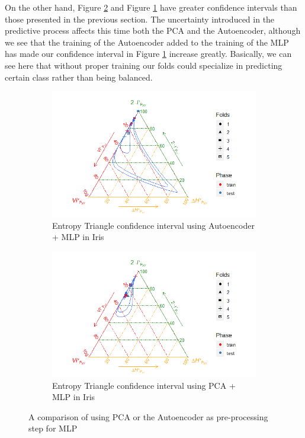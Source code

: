 On the other hand, Figure \ref{fig:figure_MLP_Iris_ET_PCA_Confidence} and Figure \ref{fig:figure_MLP_Iris_ET_Auto_Confidence} have greater confidence intervals than those presented in the previous section. The uncertainty introduced in the predictive process affects this time both the PCA and the Autoencoder, although we see that the training of the Autoencoder added to the training of the MLP has made our confidence interval in Figure \ref{fig:figure_MLP_Iris_ET_Auto_Confidence} increase greatly. Basically, we can see here that without proper training our folds could specialize in predicting certain class rather than being balanced.
%
\begin{figure}[H]
\begin{subfigure}{1\textwidth}  
	\includegraphics[width=\linewidth]{Figuras_tfg/ET_Iris_Auto_Mlp_Confidence}
	\caption{Entropy Triangle confidence interval using Autoencoder + MLP in Iris}
	\label{fig:figure_MLP_Iris_ET_Auto_Confidence}
\end{subfigure}

\begin{subfigure}{1\textwidth}  
	
	\includegraphics[width=\linewidth]{Figuras_tfg/ET_Iris_Pca_Mlp_Confidence}
	\caption{Entropy Triangle confidence interval using PCA + MLP in Iris}
	\label{fig:figure_MLP_Iris_ET_PCA_Confidence}
\end{subfigure}
\caption{A comparison of using PCA or the Autoencoder as pre-processing step for MLP}
\label{fig:figure_MLP_Iris_ET}
\end{figure}
 
